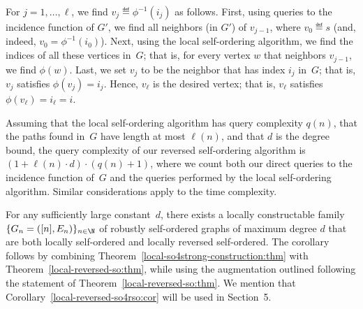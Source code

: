 For $j=1,\ldots,\ell$, we find $v_j\eqdef\phi^{-1}(i_j)$ as follows.
First, using queries to the incidence function of $G'$,
we find all neighbors (in $G'$) of $v_{j-1}$,
where $v_0\eqdef s$ (and, indeed, $v_0=\phi^{-1}(i_0)$).
Next, using the local self-ordering algorithm,
we find the indices of all these vertices in~$G$; that is,
for every vertex $w$ that neighbors $v_{j-1}$, we find $\phi(w)$.
Last, we set $v_j$ to be the neighbor that has index $i_j$ in~$G$;
that is, $v_j$ satisfies $\phi(v_j)=i_j$.
\EE
Hence, $v_\ell$ is the desired vertex;
that is, $v_\ell$ satisfies $\phi(v_\ell)=i_\ell=i$.

Assuming that
the local self-ordering algorithm has query complexity $q(n)$,
that the paths found in~$G$ have length at most $\ell(n)$,
and that $d$ is the degree bound,
the query complexity of our reversed self-ordering algorithm
is $(1+\ell(n)\cdot d)\cdot(q(n)+1)$,
where we count both our direct queries to the incidence function of~$G$
and the queries performed by the local self-ordering algorithm.
Similar considerations apply to the time complexity.
\EPF


\label{local-reversed-so4rso:cor}
For any sufficiently large constant~$d$, there exists
a locally constructable family $\{G_n=([n],E_n)\}_{n\in\N}$
of robustly self-ordered graphs of maximum degree $d$ that are
both locally self-ordered and locally reversed self-ordered.
\ECR
The corollary follows by combining
Theorem~\ref{local-so4strong-construction:thm}
with Theorem~\ref{local-reversed-so:thm},
while using the augmentation outlined following
the statement of Theorem~\ref{local-reversed-so:thm}.
We mention that Corollary~\ref{local-reversed-so4rso:cor}
will be used in Section~5.


%
%
%
%
%
%
%
%
%
%
%
%
%
%
%
%
%
%



